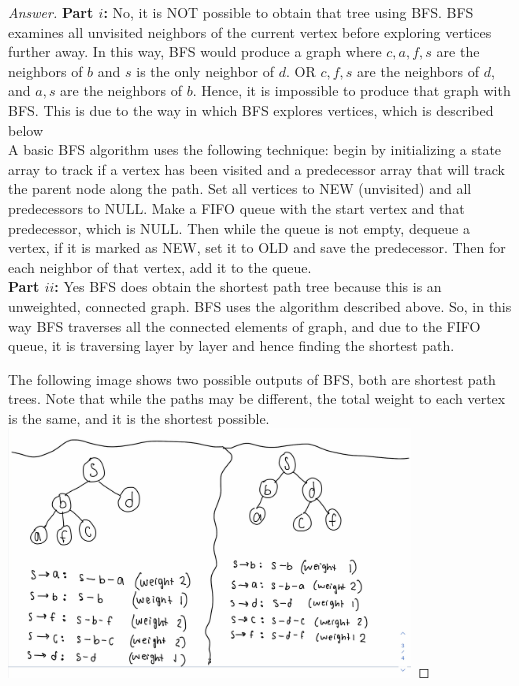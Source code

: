 \documentclass[11pt]{article}
\theoremstyle{definition}
\theoremstyle{definition}
\theoremstyle{definition}
\begin{document}


\begin{proof}[Answer]

\textbf{Part $i$:}
No, it is NOT possible to obtain that tree using BFS. BFS examines all unvisited neighbors of the current vertex before exploring vertices further away. In this way, BFS would produce a graph where $c,a,f,s$ are the neighbors of $b$ and $s$ is the only neighbor of $d$. OR $c,f,s$ are the neighbors of $d$, and $a,s$ are the neighbors of $b$. Hence, it is impossible to produce that graph with BFS. This is due to the way in which BFS explores vertices, which is described below\\

A basic BFS algorithm uses the following technique:  begin by initializing a state array to track if a vertex has been visited and a predecessor array that will track the parent node along the path. Set all vertices to NEW (unvisited) and all predecessors to NULL. Make a FIFO queue with the start vertex and that predecessor, which is NULL. Then while the queue is not empty, dequeue a vertex, if it is marked as NEW, set it to OLD and save the predecessor. Then for each neighbor of that vertex, add it to the queue. \\

\textbf{Part $ii$:}
Yes BFS does obtain the shortest path tree because this is an unweighted, connected graph. BFS uses the algorithm described above. So, in this way BFS traverses all the connected elements of graph, and due to the FIFO queue, it is traversing layer by layer and hence finding the shortest path. 

The following image shows two possible outputs of BFS, both are shortest path trees. Note that while the paths may be different, the total weight to each vertex is the same, and it is the shortest possible. \\

\includegraphics[width=0.8\textwidth]{q5}

\end{proof}




\end{document}
